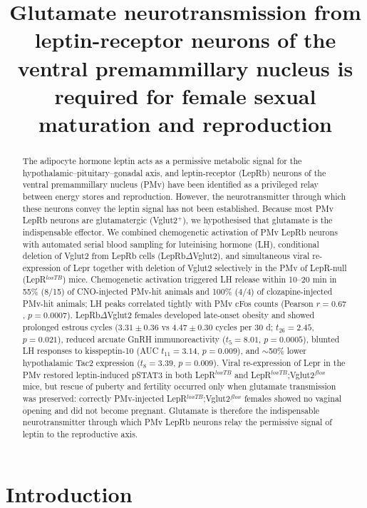 \documentclass[11pt]{article}
\title{Glutamate neurotransmission from leptin-receptor neurons of the ventral premammillary nucleus is required for female sexual maturation and reproduction}
\author{}
\date{}
\begin{document}
\maketitle

\begin{abstract}
The adipocyte hormone leptin acts as a permissive metabolic signal for the hypothalamic--pituitary--gonadal axis, and leptin-receptor (LepRb) neurons of the ventral premammillary nucleus (PMv) have been identified as a privileged relay between energy stores and reproduction. However, the neurotransmitter through which these neurons convey the leptin signal has not been established. Because most PMv LepRb neurons are glutamatergic (Vglut2$^{+}$), we hypothesised that glutamate is the indispensable effector. We combined chemogenetic activation of PMv LepRb neurons with automated serial blood sampling for luteinising hormone (LH), conditional deletion of Vglut2 from LepRb cells (LepRb$\Delta$Vglut2), and simultaneous viral re-expression of Lepr together with deletion of Vglut2 selectively in the PMv of LepR-null (LepR$^{loxTB}$) mice. Chemogenetic activation triggered LH release within 10--20 min in 55\% (8/15) of CNO-injected PMv-hit animals and 100\% (4/4) of clozapine-injected PMv-hit animals; LH peaks correlated tightly with PMv cFos counts (Pearson $r=0.67$, $p=0.0007$). LepRb$\Delta$Vglut2 females developed late-onset obesity and showed prolonged estrous cycles ($3.31\pm0.36$ vs $4.47\pm0.30$ cycles per 30 d; $t_{26}=2.45$, $p=0.021$), reduced arcuate GnRH immunoreactivity ($t_{5}=8.01$, $p=0.0005$), blunted LH responses to kisspeptin-10 (AUC $t_{11}=3.14$, $p=0.009$), and $\sim$50\% lower hypothalamic Tac2 expression ($t_{8}=3.39$, $p=0.009$). Viral re-expression of Lepr in the PMv restored leptin-induced pSTAT3 in both LepR$^{loxTB}$ and LepR$^{loxTB}$;Vglut2$^{flox}$ mice, but rescue of puberty and fertility occurred only when glutamate transmission was preserved: correctly PMv-injected LepR$^{loxTB}$;Vglut2$^{flox}$ females showed no vaginal opening and did not become pregnant. Glutamate is therefore the indispensable neurotransmitter through which PMv LepRb neurons relay the permissive signal of leptin to the reproductive axis.
\end{abstract}

\section{Introduction}
\end{document}

